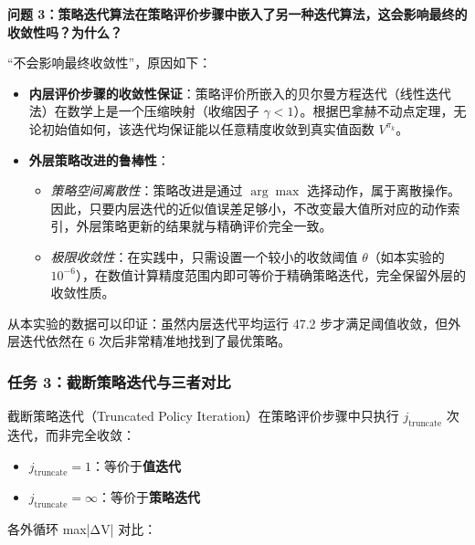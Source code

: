 \documentclass[11pt,a4paper,UTF8]{ctexart}
\numberwithin{figure}{section}
\numberwithin{table}{section}
\newcommand{\answerlabel}{%
  \par\smallskip\noindent{\heiti\bfseries 回答：}\quad}
\begin{document}
\textbf{问题 3：策略迭代算法在策略评价步骤中嵌入了另一种迭代算法，这会影响最终的收敛性吗？为什么？}


\answerlabel 

``不会影响最终收敛性''，原因如下：

\begin{itemize}
    \item \textbf{内层评价步骤的收敛性保证}：策略评价所嵌入的贝尔曼方程迭代（线性迭代法）在数学上是一个压缩映射（收缩因子 $\gamma < 1$）。根据巴拿赫不动点定理，无论初始值如何，该迭代均保证能以任意精度收敛到真实值函数 $V^{\pi_k}$。
    \item \textbf{外层策略改进的鲁棒性}：
    \begin{itemize}
        \item \textit{策略空间离散性}：策略改进是通过 $\arg\max$ 选择动作，属于离散操作。因此，只要内层迭代的近似值误差足够小，不改变最大值所对应的动作索引，外层策略更新的结果就与精确评价完全一致。
        \item \textit{极限收敛性}：在实践中，只需设置一个较小的收敛阈值 $\theta$（如本实验的 $10^{-6}$），在数值计算精度范围内即可等价于精确策略迭代，完全保留外层的收敛性质。
    \end{itemize}
\end{itemize}

从本实验的数据可以印证：虽然内层迭代平均运行 47.2 步才满足阈值收敛，但外层迭代依然在 6 次后非常精准地找到了最优策略。

\subsubsection{任务 3：截断策略迭代与三者对比}

截断策略迭代（Truncated Policy Iteration）在策略评价步骤中只执行 $j_\text{truncate}$ 次迭代，而非完全收敛：

\begin{itemize}
\item $j_\text{truncate} = 1$：等价于\textbf{值迭代}
\item $j_\text{truncate} = \infty$：等价于\textbf{策略迭代}
\end{itemize}

各外循环 max|ΔV| 对比：
\end{document}
